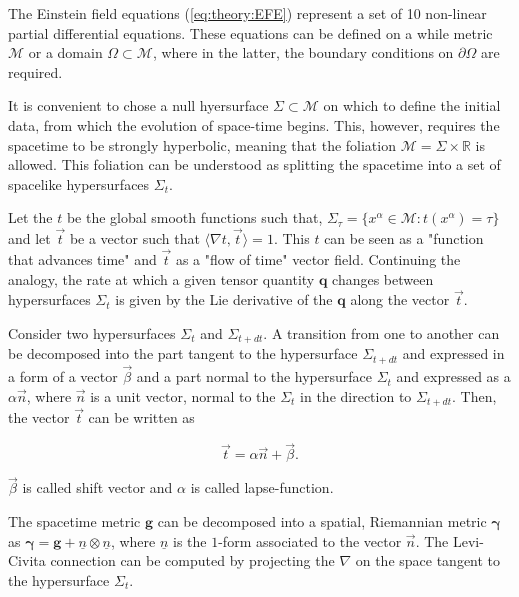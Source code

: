 \documentclass[11pt,a4paper,headinclude=true,DIV=14,BCOR=8mm,chapterprefix,listof=totoc,twoside,openright,abstracton]{scrbook}
\begin{document}

The Einstein field equations (\ref{eq:theory:EFE}) represent a set of 10 non-linear partial differential equations. These equations can be defined on a while metric $\mathcal{M}$ or a domain $\Omega\subset\mathcal{M}$, where in the latter, the boundary conditions on $\partial\Omega$ are required. 

It is convenient to chose a null hyersurface $\Sigma\subset\mathcal{M}$ on which to define the initial data, from which the evolution of space-time begins. This, however, requires the spacetime to be strongly hyperbolic, meaning that the foliation $\mathcal{M}=\Sigma\times\mathbb{R}$ is allowed. This foliation can be understood as splitting the spacetime into a set of spacelike hypersurfaces $\Sigma_t$. 


Let the $t$ be the global smooth functions such that, $\Sigma_{\tau} = \{x^{\alpha}\in\mathcal{M}: t(x^{\alpha})=\tau\}$ and let $\vec{t}$ be a vector such that $\langle\nabla t, \vec{t}\rangle = 1$. This $t$ can be seen as a "function that advances time" and $\vec{t}$ as a "flow of time" vector field. Continuing the analogy, the rate at which a given tensor quantity $\boldsymbol{q}$ changes between hypersurfaces $\Sigma_t$ is given by the Lie derivative of the $\boldsymbol{q}$ along the vector $\vec{t}$.

Consider two hypersurfaces $\Sigma_t$ and $\Sigma_{t+dt}$. A transition from one to another can be decomposed into the part tangent to the hypersurface $\Sigma_{t+dt}$ and expressed in a form of a vector $\vec{\beta}$ and a part normal to the hypersurface $\Sigma_t$ and expressed as a $\alpha \vec{n}$, where $\vec{n}$ is a unit vector, normal to the $\Sigma_t$ in the direction to $\Sigma_{t+dt}$. Then, the vector $\vec{t}$ can be written as 

\begin{equation*}
    \vec{t} = \alpha\vec{n}+\vec{\beta}.
\end{equation*}

$\vec{\beta}$ is called shift vector and $\alpha$ is called lapse-function.

The spacetime metric $\boldsymbol{g}$ can be decomposed into a spatial, Riemannian metric $\boldsymbol{\gamma}$  as $\boldsymbol{\gamma} = \boldsymbol{g} + \underline{n} \otimes \underline{n} $, where $\underline{n}$ is the $1$-form associated to the vector $\vec{n}$. 
The Levi-Civita connection can be computed by projecting the $\nabla$ on the space tangent to the hypersurface $\Sigma_t$.
\end{document}

